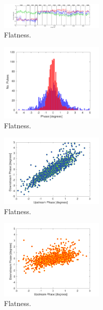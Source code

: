 \begin{figure}
  \centering
  \includegraphics[width=0.45\textwidth]{Figures/feedforward/longFF_noMeanSubHistory}
  \caption{Flatness.}
  \label{f:longFF_noMeanSubHistory}
\end{figure}

\begin{figure}
  \centering
  \includegraphics[width=0.45\textwidth]{Figures/feedforward/longFF_histDownstreamPhase}
  \caption{Flatness.}
  \label{f:longFF_histDownstreamPhase}
\end{figure}

\begin{figure}
  \centering
  \includegraphics[width=0.45\textwidth]{Figures/feedforward/longFF_scatterFFOff}
  \caption{Flatness.}
  \label{f:longFF_scatterFFOff}
\end{figure}

\begin{figure}
  \centering
  \includegraphics[width=0.45\textwidth]{Figures/feedforward/longFF_scatterFFOn}
  \caption{Flatness.}
  \label{f:longFF_scatterFFOn}
\end{figure}

